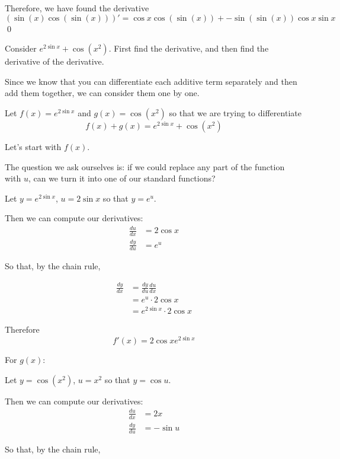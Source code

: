 \begin{solution}
    Therefore, we have found the derivative 
    \[ (\sin(x)\cos(\sin(x)))' = \cos x \cos(\sin(x)) + -\sin (\sin(x)) \cos x \sin x\]
    \qed
\end{solution}

\begin{example}
    Consider $e^{2\sin x} + \cos (x^2)$. First find the derivative, and then find the derivative of the derivative.
\end{example}
\begin{solution}
    Since we know that you can differentiate each additive term separately and then add them together, we can consider them one by one.

    Let $f(x) = e^{2\sin x} $ and $g(x) = \cos (x^2)$ so that we are trying to differentiate 
    \[f(x) + g(x) = e^{2\sin x} + \cos (x^2)\]

    Let's start with $f(x)$. 

    The question we ask ourselves is: if we could replace any part of the function with $u$, can we turn it into one of our standard functions?

    Let $y =  e^{2\sin x}$, $u = 2\sin x$ so that $y = e^u$.
    
    Then we can compute our derivatives:
    \begin{align*}
        \frac{du}{dx} &= 2\cos x \\
        \frac{dy}{du} &= e^u
    \end{align*}

    So that, by the chain rule,

    \begin{align*}
        \frac{dy}{dx} &= \frac{dy}{du}\frac{du}{dx} \\ 
         &= e^u \cdot 2\cos x \tag{substituting}\\
         &= e^{2\sin x} \cdot 2\cos x \tag{using $u = 2\sin x$}
    \end{align*}

    Therefore 
    \[ f'(x) = 2\cos x  e^{2\sin x} \]

    For $g(x)$:

    Let $y =  \cos (x^2)$, $u = x^2$ so that $y = \cos u$.
    
    Then we can compute our derivatives:
    \begin{align*}
        \frac{du}{dx} &= 2x \\
        \frac{dy}{du} &= -\sin u
    \end{align*}

    So that, by the chain rule,


\end{solution}
